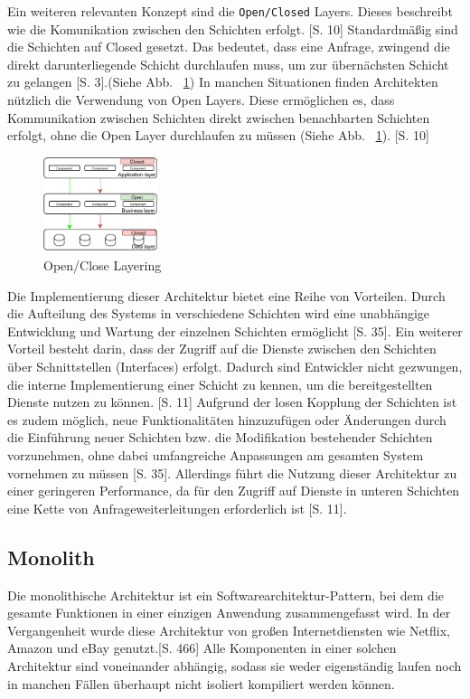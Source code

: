 \documentclass[acmtog]{acmart}
\begin{document}
Ein weiteren relevanten Konzept sind die \texttt{Open/Closed} Layers. Dieses beschreibt wie die 
Komunikation zwischen den Schichten erfolgt. \cite{layered4}[S. 10]
Standardmäßig sind die Schichten auf Closed gesetzt. Das bedeutet, dass eine Anfrage, 
zwingend die direkt darunterliegende Schicht durchlaufen muss, um zur übernächsten Schicht zu gelangen \cite{layered}[S. 3].(Siehe Abb. ~\ref{fig:layered-request-flow})
In manchen Situationen finden Architekten nützlich die Verwendung von Open Layers. Diese ermöglichen 
es, dass Kommunikation zwischen Schichten direkt zwischen benachbarten Schichten erfolgt, ohne die 
Open Layer durchlaufen zu müssen  (Siehe Abb. ~\ref{fig:layered-request-flow}). \cite{layered4}[S. 10]

\begin{figure}[h!]
    \centering
    \includegraphics[width=0.3\textwidth]{images/layer2.pdf}
    \caption{Open/Close Layering}
    \label{fig:layered-request-flow}
\end{figure}


Die Implementierung dieser Architektur bietet eine Reihe von Vorteilen. Durch 
die Aufteilung des Systems in verschiedene Schichten wird eine unabhängige 
Entwicklung und Wartung der einzelnen Schichten ermöglicht \cite{layered2}[S. 35]. 
Ein weiterer Vorteil besteht darin, dass der Zugriff auf die Dienste zwischen den 
Schichten über Schnittstellen (Interfaces) erfolgt. Dadurch sind Entwickler nicht 
gezwungen, die interne Implementierung einer Schicht zu kennen, um die bereitgestellten 
Dienste nutzen zu können. \cite{layered4}[S. 11]
Aufgrund der losen Kopplung der Schichten ist es zudem möglich, neue Funktionalitäten
hinzuzufügen oder Änderungen durch die Einführung neuer Schichten bzw. die Modifikation 
bestehender Schichten vorzunehmen, ohne dabei umfangreiche Anpassungen am gesamten 
System vornehmen zu müssen \cite{layered2}[S. 35].
Allerdings führt die Nutzung dieser Architektur zu einer geringeren Performance, da für 
den Zugriff auf Dienste in unteren Schichten eine Kette von Anfrageweiterleitungen erforderlich ist \cite{layered4}[S. 11].\\

\subsection{Monolith}
Die monolithische Architektur ist ein Softwarearchitektur-Pattern, bei dem die gesamte Funktionen in 
einer einzigen Anwendung zusammengefasst wird. 
In der Vergangenheit wurde diese Architektur von großen Internetdiensten wie Netflix, 
Amazon und eBay genutzt.\cite{mono}[S. 466]
Alle Komponenten in einer solchen Architektur sind voneinander abhängig, sodass sie 
weder eigenständig laufen noch in manchen Fällen überhaupt nicht isoliert kompiliert werden können. \cite{mono3}
\end{document}
